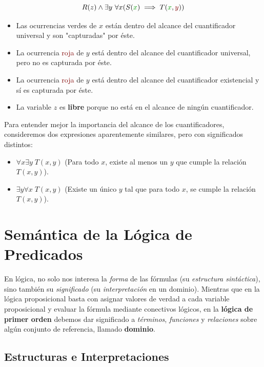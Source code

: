 \begin{equation}
    R(z) \land \exists y\ \forall x (S(\textcolor{OliveGreen}{x}) \implies T(\textcolor{OliveGreen}{x},\textcolor{Maroon}{y}))
\end{equation}

\begin{itemize}
    \item Las ocurrencias \textcolor{OliveGreen}{verdes} de $x$ están dentro del alcance del cuantificador universal y son "capturadas" por éste.
    \item La ocurrencia \textcolor{Maroon}{roja} de $y$ está dentro del alcance del cuantificador universal, pero no es capturada por éste.
    \item La ocurrencia \textcolor{Maroon}{roja} de $y$ está dentro del alcance del cuantificador existencial y sí es capturada por éste.
    \item La variable $z$ es \textbf{libre} porque no está en el alcance de ningún cuantificador.
\end{itemize}

Para entender mejor la importancia del alcance de los cuantificadores, consideremos dos expresiones aparentemente similares, pero con significados distintos:

\begin{itemize}
    \item $\forall x \exists y \; T(x, y)$ \quad (Para todo $x$, existe al menos un $y$ que cumple la relación $T(x, y)$).
    \item $\exists y \forall x \; T(x, y)$ \quad (Existe un único $y$ tal que para todo $x$, se cumple la relación $T(x, y)$).
\end{itemize}


\section{Semántica de la Lógica de Predicados}

En lógica, no solo nos interesa la \emph{forma} de las fórmulas (su \emph{estructura sintáctica}), sino también su \emph{significado} (su \emph{interpretación} en un dominio). Mientras que en la lógica proposicional basta con asignar valores de verdad a cada variable proposicional y evaluar la fórmula mediante conectivos lógicos, en la \textbf{lógica de primer orden} debemos dar significado a \emph{términos}, \emph{funciones} y \emph{relaciones} sobre algún conjunto de referencia, llamado \textbf{dominio}.

\subsection{Estructuras e Interpretaciones}

